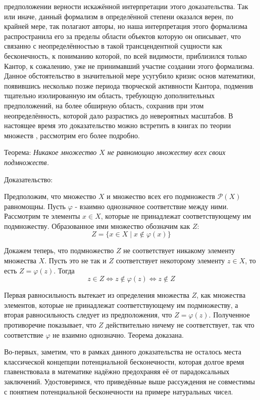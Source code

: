 \documentclass[12pt]{article}
\begin{document}
предположении верности искажённой интерпретации этого доказательства. Так или иначе, данный формализм в определённой степени оказался верен, по крайней мере, так полагают авторы, но наша интерпретация этого формализма распространила его за пределы области объектов которую он описывает, что связанно с неопределённостью в такой трансцендентной сущности как бесконечность, к пониманию которой, по всей видимости, приблизился только Кантор, к сожалению, уже не принимавший участие создании этого формализма. Данное обстоятельство в значительной мере усугубило кризис основ математики, появившись несколько позже периода творческой активности Кантора, подменив тщательно изолированную им область, требующую дополнительных предположений, на более обширную область, сохранив при этом неопределённость, которой дало разрастись до невероятных масштабов. В настоящее время это доказательство можно встретить в книгах по теории множеств \cite{cantor-common}, рассмотрим его более подробно.

Теорема: {\sl Никакое множество $X$ не равномощно множеству всех своих подмножеств.}

Доказательство: 

Предположим, что множество $X$ и множество всех его подмножеств $\mathcal{P}(X)$ равномощны. Пусть $\varphi$ - взаимно однозначное соответствие между ними. Рассмотрим те элементы $x \in X$, которые не принадлежат соответствующему им подмножеству. Образованное ими множество обозначим как $Z$:
\begin{equation}
Z = \{ x \in X \mid x \notin \varphi(x) \}
\end{equation}

Докажем теперь, что подмножество $Z$ не соответствует никакому элементу множества $X$. Пусть это не так и $Z$ соответствует некоторому элементу $z \in X$, то есть $Z = \varphi(z)$. Тогда
\begin{equation}
z \in Z \Leftrightarrow z \notin \varphi(z) \Leftrightarrow z \notin Z
\end{equation}

Первая равносильность вытекает из определения множества $Z$, как множества элементов, которые не принадлежат соответствующему им подмножеству, а вторая равносильность следует из предположения, что $Z = \varphi(z)$. Полученное противоречие показывает, что $Z$ действительно ничему не соответствует, так что соответствие $\varphi$ не взаимно однозначно. Теорема доказана.

Во-первых, заметим, что в рамках данного доказательства не осталось места классической концепции потенциальной бесконечности, которая долгое время главенствовала в математике надёжно предохраняя её от парадоксальных заключений. Удостоверимся, что приведённые выше рассуждения не совместимы с понятием потенциальной бесконечности на примере натуральных чисел. 
\end{document}
